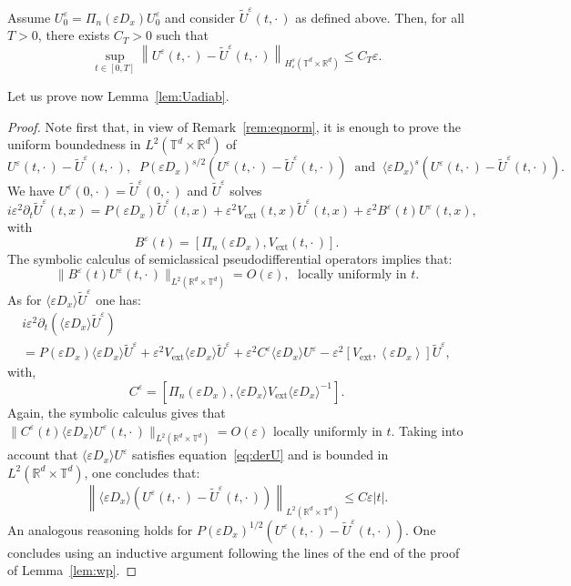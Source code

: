 \documentclass[AHL,Unicode,longabstracts]{cedram}
\DeclareMathOperator{\ext}{ext}
\newcommand*\R{{\mathbb R}}
\newcommand*\T{{\mathbb T}}
\newcommand*\eps{\varepsilon}
\numberwithin{equation}{section}
\begin{document}
\begin{lemm}\label{lem:Uadiab}
Assume $U^\eps_0= \Pi_n(\eps D_x) U^\eps_0$ and consider $\widetilde U^\eps(t,\cdot\,)$ as defined above. Then, for all $T>0$, there exists $C_{T}>0$ such that
\[
\sup_{t\in[0,T]} \left\| U^\eps(t,\cdot\,) -\widetilde U^\eps(t,\cdot\,) \right\|_{H^s_\eps(\T^d \times \R^d)} \leq C_{T}\eps.
\]
\end{lemm}


Let us prove now Lemma~\ref{lem:Uadiab}.



\begin{proof}
Note first that, in view of Remark~\ref{rem:eqnorm}, it is enough to prove the uniform boundedness in $L^2(\T^d\times\R^d)$ of
\[
U^\eps(t,\cdot\,) -\widetilde U^\eps(t,\cdot\,),\;\;
P(\eps D_x)^{s/2}(U^\eps(t,\cdot\,) -\widetilde U^\eps(t,\cdot\,))\;\;\text{and}\;\;
\langle \eps D_x\rangle ^s(U^\eps(t,\cdot\,) -\widetilde U^\eps(t,\cdot\,)).
\]
We have $U^\eps(0,\cdot\,)=\widetilde U^\eps(0,\cdot\,)$ and $\widetilde U^\eps$ solves
\begin{equation}\label{eq:Utilde}
i\eps^2\partial_t \widetilde U^\eps(t,x)=P(\eps D_x) \widetilde U^\eps (t,x)+ \eps^2 V_{\ext}(t,x)\widetilde U^\eps (t,x)+ \eps^2 B^\eps (t)U^\eps(t,x),
\end{equation}
with
\[
B^\eps(t) =[\Pi_n(\eps D_x), V_{\ext}(t,\cdot\,)].
\]
The symbolic calculus of semiclassical pseudodifferential operators implies that:
\[
\|B^\eps(t) U^\eps(t,\cdot\,)\|_{L^2(\R^d\times\T^d)}=O(\eps), \;\text{ locally uniformly in }t.
\]
As for $\langle \eps D_x\rangle \widetilde U^\eps$ one has:
\begin{multline*}
i\eps^2\partial_t (\langle \eps D_x\rangle\widetilde U^\eps)\\=P(\eps D_x) \langle \eps D_x\rangle\widetilde U^\eps + \eps^2 V_{\ext} \langle \eps D_x\rangle \widetilde U^\eps + \eps^2C^\eps\langle \eps D_x\rangle U^\eps- \eps^2[V_{\ext}, \left\langle\eps D_x\right\rangle] \widetilde U^\eps,
\end{multline*}
with,
\[
C^\eps=\left[\Pi_n(\eps D_x), \langle \eps D_x\rangle V_{\ext}\langle \eps D_x\rangle^{-1}\right].
\]
Again, the symbolic calculus gives that $\|C^\eps(t)\langle \eps D_x\rangle U^\eps(t,\cdot\,)\|_{L^2(\R^d\times\T^d)}=O(\eps)$ locally uniformly in $t$. Taking into account that $\langle \eps D_x\rangle U^\eps$ satisfies equation~\eqref{eq:derU} and is bounded in $L^2(\R^d\times\T^d)$, one concludes that:
\[
\left\|\langle \eps D_x\rangle \left(U^\eps(t,\cdot\,) -\widetilde U^\eps(t,\cdot\,)\right)\right\|_{L^2(\R^d\times \T^d)}\leq C\eps|t|.
\]
An analogous reasoning holds for $P(\eps D_x)^{1/2}(U^\eps(t,\cdot\,) -\widetilde U^\eps(t,\cdot\,))$. One concludes using an inductive argument following the lines of the end of the proof of Lemma~\ref{lem:wp}.
\end{proof}
\end{document}
